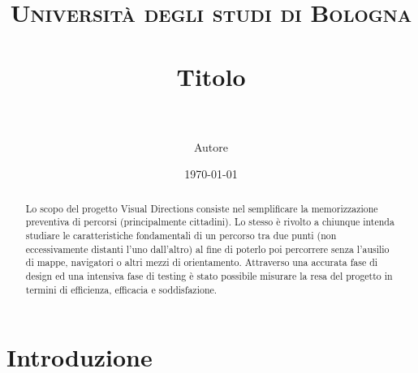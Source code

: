 \documentclass[paper=a4, fontsize=12pt]{scrartcl} %
\title{	
\normalfont \normalsize 
\textsc{Università degli studi di Bologna} \\ [25pt]
\horrule{0.5pt} \\[0.4cm]
\huge Titolo \\
\horrule{2pt} \\[0.5cm]
}
\author{Autore}
\date{\normalsize\today}
\begin{document}
\maketitle

\begin{abstract}
Lo scopo del progetto Visual Directions consiste nel semplificare la memorizzazione preventiva di percorsi (principalmente cittadini). Lo stesso è rivolto a chiunque intenda studiare le caratteristiche fondamentali di un percorso tra due punti (non eccessivamente distanti l’uno dall’altro) al fine di poterlo poi percorrere senza l’ausilio di mappe, navigatori o altri mezzi di orientamento. Attraverso una accurata fase di design ed una intensiva fase di testing è stato possibile misurare la resa del progetto in termini di efficienza, efficacia e soddisfazione.
\end{abstract}


\section{Introduzione}





\nocite{*}

\end{document}
